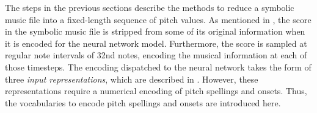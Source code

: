 
The steps in the previous sections describe the methods to
reduce a symbolic music file into a fixed-length sequence of
pitch values. As mentioned in
, the score in the symbolic
music file is stripped from some of its original information
when it is encoded for the neural network model.
Furthermore, the score is sampled at regular note intervals
of \gls{32nd} notes, encoding the musical information at
each of those timesteps. The encoding dispatched to the
neural network takes the form of three \emph{input
representations}, which are described in
. However, these
representations require a numerical encoding of pitch
spellings and onsets. Thus, the vocabularies to encode pitch
spellings and onsets are introduced here.
